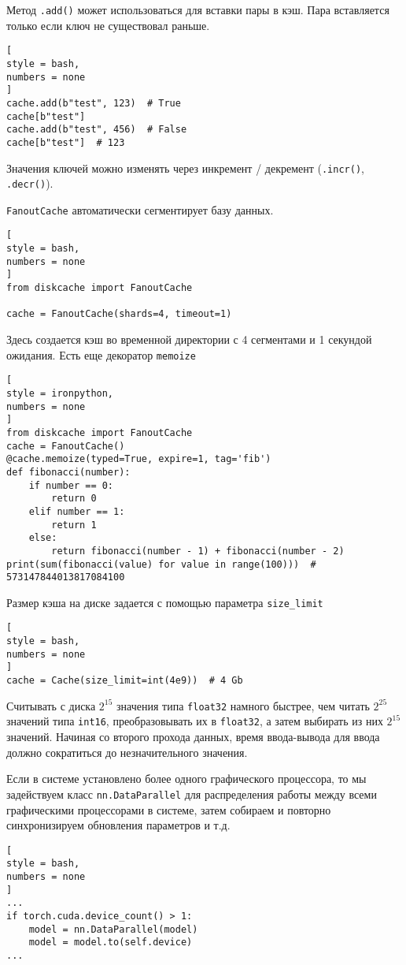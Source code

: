 \documentclass[%
	11pt,
	a4paper,
	utf8,
		]{article}
\begin{document}
Метод \verb|.add()| может использоваться для вставки пары в кэш. Пара вставляется только если ключ не существовал раньше.

\begin{lstlisting}[
style = bash,
numbers = none
]
cache.add(b"test", 123)  # True
cache[b"test"]
cache.add(b"test", 456)  # False
cache[b"test"]  # 123
\end{lstlisting}

Значения ключей можно изменять через инкремент / декремент (\verb|.incr()|, \verb|.decr()|).

\verb|FanoutCache| автоматически сегментирует базу данных. 
\begin{lstlisting}[
style = bash,
numbers = none
]
from diskcache import FanoutCache

cache = FanoutCache(shards=4, timeout=1)
\end{lstlisting}

Здесь создается кэш во временной директории с 4 сегментами и 1 секундой ожидания. Есть еще декоратор \verb|memoize|
\begin{lstlisting}[
style = ironpython,
numbers = none
]
from diskcache import FanoutCache
cache = FanoutCache()
@cache.memoize(typed=True, expire=1, tag='fib')
def fibonacci(number):
	if number == 0:
		return 0
	elif number == 1:
		return 1
	else:
		return fibonacci(number - 1) + fibonacci(number - 2)
print(sum(fibonacci(value) for value in range(100)))  # 573147844013817084100
\end{lstlisting}

Размер кэша на диске задается с помощью параметра \verb|size_limit|
\begin{lstlisting}[
style = bash,
numbers = none
]
cache = Cache(size_limit=int(4e9))  # 4 Gb
\end{lstlisting}

Считывать с диска $2^{15}$ значения типа \verb|float32| намного быстрее, чем читать $2^{25}$ значений типа \verb|int16|, преобразовывать их в \verb|float32|, а затем выбирать из них $2^{15}$ значений. Начиная со второго прохода данных, время ввода-вывода для ввода должно сократиться до незначительного значения.

Если в системе установлено более одного графического процессора, то мы задействуем класс \verb|nn.DataParallel| для распределения работы между всеми графическими процессорами в системе, затем собираем и повторно синхронизируем обновления параметров и т.д.
\begin{lstlisting}[
style = bash,
numbers = none
]
...
if torch.cuda.device_count() > 1:
    model = nn.DataParallel(model)
    model = model.to(self.device)
...
\end{lstlisting}
\end{document}
